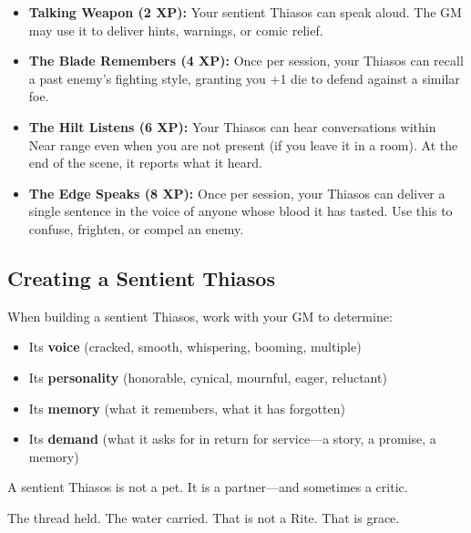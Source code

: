\begin{itemize}
\item \textbf{Talking Weapon (2 XP):} Your sentient Thiasos can speak aloud. The GM may use it to deliver hints, warnings, or comic relief.
\item \textbf{The Blade Remembers (4 XP):} Once per session, your Thiasos can recall a past enemy's fighting style, granting you +1 die to defend against a similar foe.
\item \textbf{The Hilt Listens (6 XP):} Your Thiasos can hear conversations within Near range even when you are not present (if you leave it in a room). At the end of the scene, it reports what it heard.
\item \textbf{The Edge Speaks (8 XP):} Once per session, your Thiasos can deliver a single sentence in the voice of anyone whose blood it has tasted. Use this to confuse, frighten, or compel an enemy.
\end{itemize}

\subsection*{Creating a Sentient Thiasos}

When building a sentient Thiasos, work with your GM to determine:

\begin{itemize}
\item Its \textbf{voice} (cracked, smooth, whispering, booming, multiple)
\item Its \textbf{personality} (honorable, cynical, mournful, eager, reluctant)
\item Its \textbf{memory} (what it remembers, what it has forgotten)
\item Its \textbf{demand} (what it asks for in return for service—a story, a promise, a memory)
\end{itemize}

A sentient Thiasos is not a pet. It is a partner—and sometimes a critic.

The thread held. The water carried. That is not a Rite. That is grace.
